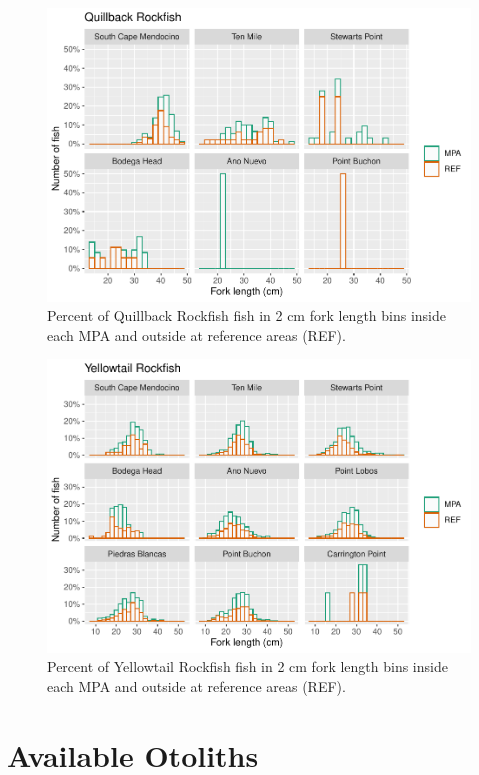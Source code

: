 \documentclass[
]{article}
\begin{document}
\begin{figure}
\centering
\includegraphics{CCRFP_available_data_for_assessments_files/figure-latex/fig-lengths-3.pdf}
\caption{\label{fig:fig-lengths-3}Percent of Quillback Rockfish fish in 2 cm fork length bins inside each MPA and outside at reference areas (REF).}
\end{figure}

\begin{figure}
\centering
\includegraphics{CCRFP_available_data_for_assessments_files/figure-latex/fig-lengths-4.pdf}
\caption{\label{fig:fig-lengths-4}Percent of Yellowtail Rockfish fish in 2 cm fork length bins inside each MPA and outside at reference areas (REF).}
\end{figure}

\hypertarget{available-otoliths}{%
\section{Available Otoliths}\label{available-otoliths}}
\end{document}
